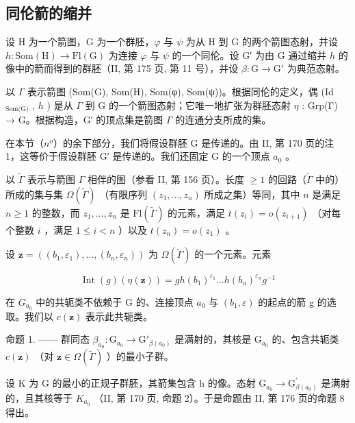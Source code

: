 \subsection{同伦箭的缩并}

设 H 为一个箭图，G 为一个群胚，\(\varphi\) 与 \(\psi\) 为从 H 到 G 的两个箭图态射，并设 \(h\colon \mathrm{Som}(\mathrm{H})\to \mathrm{Fl}(\mathrm{G})\) 为连接 \(\varphi\) 与 \(\psi\) 的一个同伦。设 G′ 为由 G 通过缩并 \(h\) 的像中的箭而得到的群胚（II, 第 175 页, 第 11 号），并设 \(\beta\colon\mathrm{G}\to\mathrm{G}'\) 为典范态射。

以 \(\Gamma\) 表示箭图 (Som(G), Som(H), Som(φ), Som(ψ))。根据同伦的定义，偶 (Id \(_{\text{Som(G)}}\) , \(h\) ) 是从 \(\Gamma\) 到 G 的一个箭图态射；它唯一地扩张为群胚态射 \(\eta\) : Grp(Γ) → G。根据构造，G′ 的顶点集是箭图 \(\Gamma\) 的连通分支所成的集。

在本节（\(n^{o}\)）的余下部分，我们将假设群胚 G 是传递的。由 II, 第 170 页的注 1，这等价于假设群胚 G′ 是传递的。我们还固定 G 的一个顶点 \(a_{0}\) 。

以 \(\widetilde{\Gamma}\) 表示与箭图 \(\Gamma\) 相伴的图（参看 II, 第 156 页）。长度 \(\geqslant 1\) 的回路（\(\widetilde{\Gamma}\) 中的）所成的集与集 \(\Omega(\widetilde{\Gamma})\) （有限序列 \((z_1, \ldots, z_n)\) 所成之集）等同，其中 \(n\) 是满足 \(n \geqslant 1\) 的整数，而 \(z_1, \ldots, z_n\) 是 \(\mathrm{Fl}(\widetilde{\Gamma})\) 的元素，满足 \(t(z_i) = o(z_{i+1})\) （对每个整数 \(i\) ，满足 \(1 \leqslant i < n\) ）以及 \(t(z_n) = o(z_1)\) 。

设 \(\mathbf{z} = ((b_{1}, \varepsilon_{1}), \ldots, (b_{n}, \varepsilon_{n}))\) 为 \(\Omega(\widetilde{\Gamma})\) 的一个元素。元素

\[
\operatorname{Int} (g) (\eta (\mathbf {z})) = g h (b _ {1}) ^ {\varepsilon_ {1}} \dots h (b _ {n}) ^ {\varepsilon_ {n}} g ^ {- 1}
\]

在 \(G_{a_{0}}\) 中的共轭类不依赖于 G 的、连接顶点 \(a_{0}\) 与 \((b_{1},\varepsilon)\) 的起点的箭 g 的选取。我们以 \(c(\mathbf{z})\) 表示此共轭类。

命题 1. —— 群同态 \(\beta_{a_0} \colon \mathrm{G}_{a_0} \to \mathrm{G}'_{\beta(a_0)}\) 是满射的，其核是 \(\mathrm{G}_{a_0}\) 的、包含共轭类 \(c(\mathbf{z})\) （对 \(\mathbf{z} \in \Omega(\widetilde{\Gamma})\) ）的最小子群。

设 K 为 G 的最小的正规子群胚，其箭集包含 h 的像。态射 \(\mathrm{G}_{a_{0}} \rightarrow \mathrm{G}^{\prime}_{\beta(a_{0})}\) 是满射的，且其核等于 \(K_{a_{0}}\) （II, 第 170 页, 命题 2）。于是命题由 II, 第 176 页的命题 8 得出。

